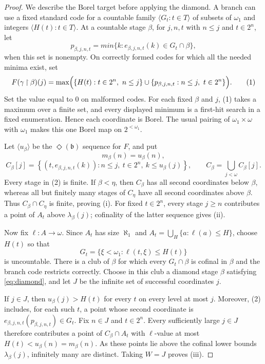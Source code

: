 \documentclass[11pt]{article}
\begin{document}
\begin{proof}
We describe the Borel target before applying the diamond.  A branch can use a
fixed standard code for a countable family
$\langle G_t:t\in T\rangle$ of subsets of $\omega_1$ and integers
$\langle H(t):t\in T\rangle$.  At a countable stage $\beta$, for $j,n,t$ with
$n\le j$ and $t\in2^n$, let
\[
 p_{\beta,j,n,t}=min\{k:e_{\beta,j,n,t}(k)\in G_t\cap\beta\},
\]
when this set is nonempty.  On correctly formed codes for which all the needed
minima exist, set
\[
 F(\gamma\mathbin{\upharpoonright}\beta)(j)
 =\max\Bigl(
   \{H(t):t\in2^n,\ n\le j\}
   \cup
   \{p_{\beta,j,n,t}:n\le j,\ t\in2^n\}
 \Bigr).
\tag{1}
\]
Set the value equal to $0$ on malformed codes.  For each fixed $\beta$ and
$j$, (1) takes a maximum over a finite set, and every displayed minimum is a
first-hit search in a fixed enumeration.  Hence each coordinate is Borel.
The usual pairing of $\omega_1\times\omega$ with $\omega_1$ makes this one
Borel map on $2^{<\omega_1}$.

Let $\langle u_\beta\rangle$ be the $\Diamond(\mathfrak b)$ sequence for $F$,
and put
\[
 m_\beta(n)=u_\beta(n),
\]
\[
 C_\beta[j]=
 \left\{(t,e_{\beta,j,n,t}(k)):
 n\le j,\ t\in2^n,\ k\le u_\beta(j)\right\},
 \qquad C_\beta=\bigcup_{j<\omega}C_\beta[j].
\tag{2}
\]
Every stage in (2) is finite.  If $\beta<\eta$, then $C_\beta$ has all second
coordinates below $\beta$, whereas all but finitely many stages of $C_\eta$
have all second coordinates above $\beta$.  Thus $C_\beta\cap C_\eta$ is
finite, proving (i).  For fixed $t\in2^n$, every stage $j\ge n$ contributes a
point of $A_t$ above $\lambda_\beta(j)$; cofinality of the latter sequence
gives (ii).

Now fix $\ell:A\to\omega$.  Since $A_t$ has size $\aleph_1$ and
$A_t=\bigcup_H\{a:\ell(a)\le H\}$, choose $H(t)$ so that
\[
             G_t=\{\xi<\omega_1:\ell(t,\xi)\le H(t)\}
\]
is uncountable.  There is a club of $\beta$ for which every $G_t\cap\beta$ is
cofinal in $\beta$ and the branch code restricts correctly.  Choose in this
club a diamond stage $\beta$ satisfying \eqref{eq:diamond}, and let $J$ be the
infinite set of successful coordinates $j$.

If $j\in J$, then $u_\beta(j)>H(t)$ for every $t$ on every level at most $j$.
Moreover, (2) includes, for each such $t$, a point whose second coordinate is
$e_{\beta,j,n,t}(p_{\beta,j,n,t})\in G_t$.  Fix $n\in J$ and $t\in2^n$.
Every sufficiently large $j\in J$ therefore contributes a point of
$C_\beta\cap A_t$ with $\ell$-value at most $H(t)<u_\beta(n)=m_\beta(n)$.
As these points lie above the cofinal lower bounds $\lambda_\beta(j)$, infinitely
many are distinct.  Taking $W=J$ proves (iii).
\end{proof}
\end{document}
